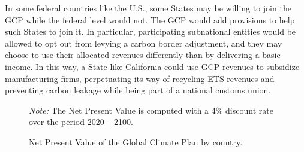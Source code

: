 \documentclass[12pt,english]{article}
\begin{document}
In some federal countries like the U.S., some States may be willing to join the GCP while the federal level would not. The GCP would add provisions to help such States to join it. In particular, participating subnational entities would be allowed to opt out from levying a carbon border adjustment, and they may choose %
to use their allocated revenues differently than by delivering a basic income. 
In this way, a State like California could use GCP revenues to subsidize manufacturing firms, perpetuating its way of recycling ETS revenues and preventing carbon leakage while being part of a national customs union. %

\begin{figure}[b!]
  \caption{Net Present Value of the Global Climate Plan by country.}\label{fig:median_gain_adj}
  {\footnotesize \textit{Note:} The Net Present Value is computed with a 4\% discount rate over the period 2020 -- 2100.}
\end{figure}
\end{document}
